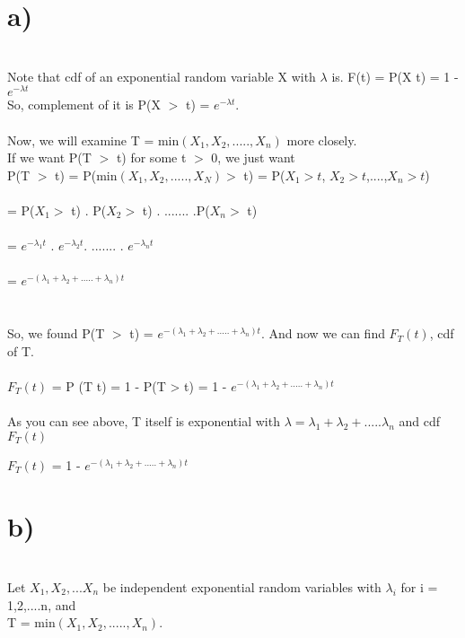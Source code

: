 \documentclass[11pt]{article}
\begin{document}
\section*{a)} \\
Note that cdf of an exponential random variable X with $\lambda$ is.
F(t) = P(X \leq t) = 1 - $e^{-\lambda t}$ \\
So, complement of it is 
P(X $>$ t) = $e^{-\lambda t}$.\\ \\
\noindent Now, we will examine T = min$(X_1,X_2,.....,X_n)$ more closely. \\ 

\noindent If we want P(T $>$ t) for some t $>$ 0, we just want \\ 

\noindent P(T $>$ t) = P(min$(X_1,X_2,.....,X_N) > $ t) = P($X_1 > t$, $X_2 > t$,....,$X_n > t$) \\ \\ = P($X_1 > $ t) .   P($X_2 > $ t) . .......  .P($X_n > $ t)  \\ \\
= $e^{-\lambda_1 t}$ . $e^{-\lambda_2 t}$. ....... . $e^{-\lambda_n t}$ \\ \\
= $e^{-(\lambda_1 + \lambda_2 + ..... + \lambda_n)t}$ \\ \\ \\ 

\noindent So, we found P(T $>$ t) =  $e^{-(\lambda_1 + \lambda_2 + ..... + \lambda_n)t}$. And now we can find $F_T(t)$, cdf of T. \\ \\

\noindent $F_T(t)$ = P (T \leq t) = 1 - P(T > t) = 1 - $e^{-(\lambda_1 + \lambda_2 + ..... + \lambda_n)t}$ \\ \\

\noindent As you can see above, T itself is exponential with $\lambda = \lambda_1 + \lambda_2 + ..... \lambda_n$ and cdf $F_T(t)$ \\

\begin{center}
    $F_T(t)$ = 1 - $e^{-(\lambda_1 + \lambda_2 + ..... + \lambda_n)t}$
\end{center}
\newpage


\section*{b)} \\
\indent Let $X_1 , X_2, ... X_n$ be independent exponential random variables with $\lambda_i$ for i = 1,2,....n,  and  \\ T = min$(X_1,X_2,.....,X_n)$. \\ \\
\end{document}
